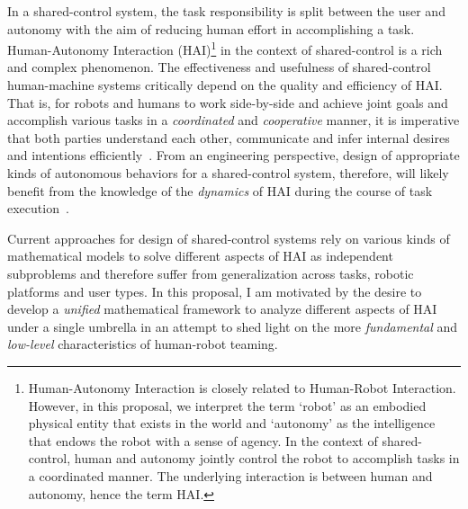 \documentclass[12pt]{article}
\begin{document}
In a shared-control system, the task responsibility is split between the user and autonomy  with the aim of reducing human effort in accomplishing a task. Human-Autonomy Interaction (HAI)\footnote{Human-Autonomy Interaction is closely related to Human-Robot Interaction. However, in this proposal, we interpret the term `robot' as an embodied physical entity that exists in the world and `autonomy' as the intelligence that endows the robot with a sense of agency. In the context of shared-control, human and autonomy jointly control the robot to accomplish tasks in a coordinated manner. The underlying interaction is between human and autonomy, hence the term HAI.} in the context of shared-control is a rich and complex phenomenon. The effectiveness and usefulness of shared-control human-machine systems critically depend on the quality and efficiency of HAI. That is, for robots and humans to work side-by-side and achieve joint goals and accomplish various tasks in a \textit{coordinated} and \textit{cooperative} manner, it is imperative that both parties understand each other, communicate and infer internal desires and intentions efficiently~\cite{hoc2001towards}. From an engineering perspective, design of appropriate kinds of autonomous behaviors for a shared-control system, therefore, will likely benefit from the knowledge of the \textit{dynamics} of HAI during the course of task execution~\cite{hoffman2007cost}. 

Current approaches for design of shared-control systems rely on various kinds of mathematical models to solve different aspects of HAI as independent subproblems and therefore suffer from generalization across tasks, robotic platforms and user types. In this proposal, I am motivated by the desire to develop a \textit{unified} mathematical framework to analyze different aspects of HAI under a single umbrella in an attempt to shed light on the more \textit{fundamental} and \textit{low-level} characteristics of human-robot teaming.
\end{document}
